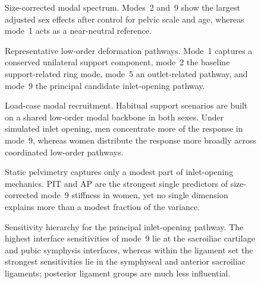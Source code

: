 \documentclass[openacc]{rsproca_new}
\begin{document}
\begin{figure}[p]
\centering
{}
\caption{Size-corrected modal spectrum. Modes~2 and~9 show the largest adjusted sex effects after control for pelvic scale and age, whereas mode~1 acts as a near-neutral reference.}
\label{fig:eigs}
\end{figure}

\begin{figure}[p]
\centering
{}
\caption{Representative low-order deformation pathways. Mode~1 captures a conserved unilateral support component, mode~2 the baseline support-related ring mode, mode~5 an outlet-related pathway, and mode~9 the principal candidate inlet-opening pathway.}
\label{fig:modeshapes}
\end{figure}

\begin{figure}[p]
\centering
{}
\caption{Load-case modal recruitment. Habitual support scenarios are built on a shared low-order modal backbone in both sexes. Under simulated inlet opening, men concentrate more of the response in mode~9, whereas women distribute the response more broadly across coordinated low-order pathways.}
\label{fig:recruitment}
\end{figure}

\begin{figure}[p]
\centering
{}
\caption{Static pelvimetry captures only a modest part of inlet-opening mechanics. PIT and AP are the strongest single predictors of size-corrected mode~9 stiffness in women, yet no single dimension explains more than a modest fraction of the variance.}
\label{fig:pelvimetry}
\end{figure}

\begin{figure}[p]
\centering
{}
\caption{Sensitivity hierarchy for the principal inlet-opening pathway. The highest interface sensitivities of mode~9 lie at the sacroiliac cartilage and pubic symphysis interfaces, whereas within the ligament set the strongest sensitivities lie in the symphyseal and anterior sacroiliac ligaments; posterior ligament groups are much less influential.}
\label{fig:sensitivity}
\end{figure}

\clearpage
\printbibliography
\end{document}
